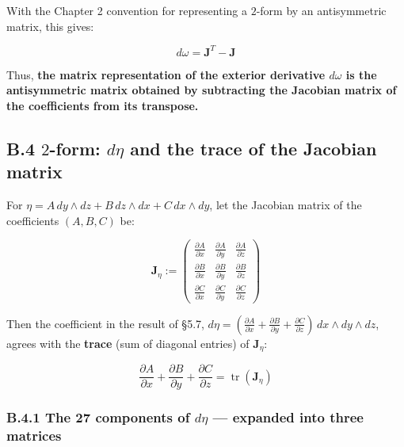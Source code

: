 With the Chapter 2 convention for representing a \(2\)-form by an
antisymmetric matrix, this gives:

\[d\omega = \mathbf{J}^T - \mathbf{J}\]

Thus,
\textbf{the matrix representation of the exterior derivative $d\omega$ is the antisymmetric matrix obtained by subtracting the Jacobian matrix of the coefficients from its transpose.}

\hypertarget{b.4-2-form-deta-and-the-trace-of-the-jacobian-matrix}{%
\subsection{\texorpdfstring{B.4 \(2\)-form: \(d\eta\) and the trace of
the Jacobian
matrix}{B.4 2-form: d\textbackslash eta and the trace of the Jacobian matrix}}\label{b.4-2-form-deta-and-the-trace-of-the-jacobian-matrix}}

For \(\eta = A\,dy \wedge dz + B\,dz \wedge dx + C\,dx \wedge dy\), let
the Jacobian matrix of the coefficients \((A,B,C)\) be:

\[\mathbf{J}_\eta := \begin{pmatrix}
\frac{\partial A}{\partial x} & \frac{\partial A}{\partial y} & \frac{\partial A}{\partial z} \\
\frac{\partial B}{\partial x} & \frac{\partial B}{\partial y} & \frac{\partial B}{\partial z} \\
\frac{\partial C}{\partial x} & \frac{\partial C}{\partial y} & \frac{\partial C}{\partial z}
\end{pmatrix}\]

Then the coefficient in the result of §5.7,
\(d\eta = (\frac{\partial A}{\partial x} + \frac{\partial B}{\partial y} + \frac{\partial C}{\partial z})\,dx \wedge dy \wedge dz\),
agrees with the \textbf{trace} (sum of diagonal entries) of
\(\mathbf{J}_\eta\):

\[\frac{\partial A}{\partial x} + \frac{\partial B}{\partial y} + \frac{\partial C}{\partial z} = \operatorname{tr}(\mathbf{J}_\eta)\]

\hypertarget{b.4.1-the-27-components-of-deta-expanded-into-three-matrices}{%
\subsubsection{\texorpdfstring{B.4.1 The 27 components of \(d\eta\) ---
expanded into three
matrices}{B.4.1 The 27 components of d\textbackslash eta --- expanded into three matrices}}\label{b.4.1-the-27-components-of-deta-expanded-into-three-matrices}}

